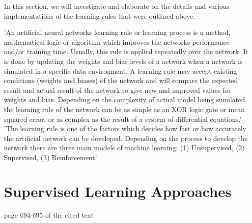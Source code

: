 In this section, we will investigate and elaborate on the details and various implementations of the learning rules that were outlined above.

'An artificial neural networks learning rule or learning process is a method, mathematical logic or algorithm which improves the networks performance and/or training time. Usually, this rule is applied repeatedly over the network. It is done by updating the weights and bias levels of a network when a network is simulated in a specific data environment. A learning rule may accept existing conditions (weights and biases) of the network and will compare the expected result and actual result of the network to give new and improved values for weights and bias. Depending on the complexity of actual model being simulated, the learning rule of the network can be as simple as an XOR logic gate or mean squared error, or as complex as the result of a system of differential equations.'
'The learning rule is one of the factors which decides how fast or how accurately the artificial network can be developed. Depending on the process to develop the network there are three main models of machine learning: (1) Unsupervised, (2) Supervised, (3) Reinforcement'



\section{Supervised Learning Approaches}

page 694-695 of the cited text

